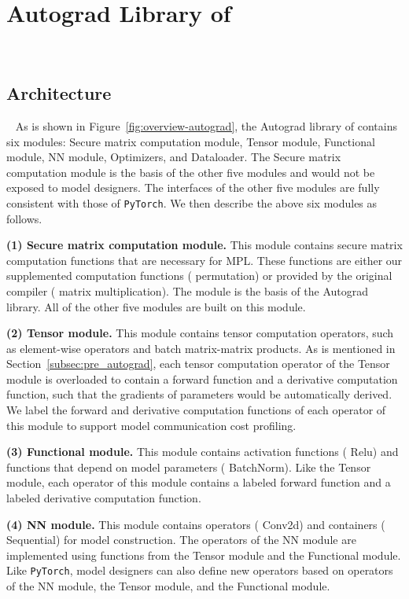 \section{Autograd Library of \hawkeye}~\label{sec:autograd}
\subsection{Architecture}~\label{subsec:autograd_architecture}
As is shown in Figure~\ref{fig:overview-autograd}, the Autograd library of \hawkeye contains six modules: Secure matrix computation module, Tensor module, Functional module, NN module, Optimizers, and Dataloader. The Secure matrix computation module is the basis of the other five modules and would not be exposed to model designers. The interfaces of the other five modules are fully consistent with those of \texttt{PyTorch}. We then describe the above six modules as follows.

    \noindent \textbf{(1) Secure matrix computation module.} This module contains secure matrix computation functions that are necessary for MPL. These functions are either our supplemented computation functions ( permutation) or provided by the original \mpspdz compiler ( matrix multiplication). The module is the basis of the \hawkeye Autograd library. All of the other five modules are built on this module.
    
    \noindent \textbf{(2) Tensor module.} This module contains tensor computation operators, such as element-wise operators and batch matrix-matrix products. As is mentioned in Section~\ref{subsec:pre_autograd}, each tensor computation operator of the Tensor module is overloaded to contain a forward function and a derivative computation function, such that the gradients of parameters would be automatically derived. We label the forward and derivative computation functions of each operator of this module to support model communication cost profiling.
    
    \noindent \textbf{(3) Functional module.} This module contains activation functions ( Relu) and functions that depend on model parameters ( BatchNorm). Like the Tensor module, each operator of this module contains a labeled forward function and a labeled derivative computation function.
    
    \noindent  \textbf{(4) NN module.} This module contains operators ( Conv2d) and containers ( Sequential) for model construction. The operators of the NN module are implemented using functions from the Tensor module and the Functional module. Like \texttt{PyTorch}, model designers can also define new operators based on operators of the NN module, the Tensor module, and the Functional module.
    
